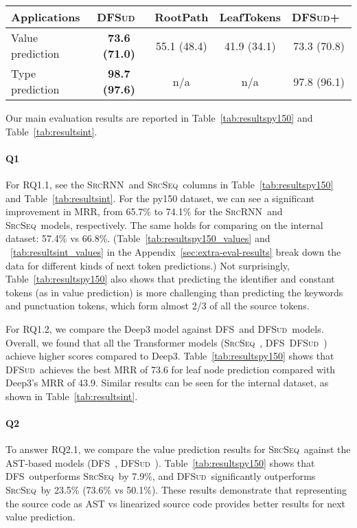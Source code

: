 \documentclass[nonacm, sigconf]{acmart}
\newcommand{\abbr}[1]{\textsc{#1}~}
\newcommand{\SrcSeq}{\abbr{SrcSeq}} \newcommand{\SrcRNN}{\abbr{SrcRNN}} \newcommand{\LeafSeq}{\abbr{LeafSeq}} \newcommand{\RootPath}{\abbr{RootPath}} \newcommand{\LeafTokens}{\abbr{LeafTokens}} \newcommand{\DFS}{\abbr{DFS}} \newcommand{\TreeRel}{\abbr{DFS{ud}}} \newcommand{\TreeReli}{\abbr{DFS{ud+}}}
\newcommand{\tabref}[1]{Table~\ref{#1}}
\begin{document}
\begin{table*}[]
    \centering
    \begin{tabular}{l|c|ccc}
    \hline
    \textbf{Applications} & \TreeRel & RootPath & LeafTokens & \TreeReli \\
    \hline
    Value prediction      & \textbf{73.6 (71.0)} & 55.1 (48.4) & 41.9 (34.1) & 73.3 (70.8) \\
    Type prediction       & \textbf{98.7 (97.6)} & n/a         & n/a         & 97.8 (96.1) \\
    \hline
    \end{tabular}
    \caption{MRR and Acc@1 (in parenthesis) of the alternate models and variations of models for py150, compared against the best performing model, \TreeRel.}
    \label{tab:dfs_alternate}
\end{table*}

Our main evaluation results are reported in Table~\ref{tab:resultspy150} and Table~\ref{tab:resultsint}.




\paragraph{Q1}

For RQ1.1, see the \SrcRNN and \SrcSeq columns in Table~\ref{tab:resultspy150} and Table~\ref{tab:resultsint}. For the py150 dataset, we can see a significant improvement in MRR, from 65.7\% to 74.1\% for the \SrcRNN and \SrcSeq models, respectively. The same holds for comparing on the internal dataset: 57.4\% vs 66.8\%. (Table~\ref{tab:resultspy150_values} and ~\ref{tab:resultsint_values} in the Appendix~\ref{sec:extra-eval-results} break down the data for different kinds of next token predictions.) Not surprisingly, \tabref{tab:resultspy150} also shows that predicting the identifier and constant tokens (as in value prediction) is more challenging than predicting the keywords and punctuation tokens, which form almost 2/3 of all the source tokens.

For RQ1.2, we compare the Deep3 model against \DFS and \TreeRel models. 
Overall, we found that all the Transformer models (\SrcSeq, \DFS \TreeRel) achieve higher scores compared to Deep3. Table~\ref{tab:resultspy150} shows that \TreeRel achieves the best MRR of 73.6 for leaf node prediction compared with Deep3's MRR of 43.9.  
Similar results can be seen for the internal dataset, as shown in Table~\ref{tab:resultsint}.


\paragraph{Q2}
To answer RQ2.1, we compare the value prediction results for \SrcSeq against the AST-based models (\DFS, \TreeRel). Table~\ref{tab:resultspy150} shows that \DFS outperforms \SrcSeq by 7.9\%, and \TreeRel significantly outperforms \SrcSeq by 23.5\% (73.6\% vs 50.1\%). These results demonstrate that representing the source code as AST vs linearized source code provides better results for next value prediction.
\end{document}
